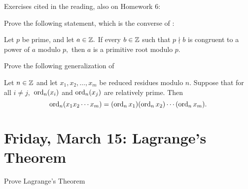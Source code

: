 \documentclass[letterpaper, 11 pt]{ximera}
\begin{document}
Exercises cited in the reading, also on Homework 6:



\begin{br}
    Prove the following statement, which is the converse of :

    Let $p$ be prime, and let $a\in\mathbb Z.$ If every $b\in\mathbb Z$ such that $p\nmid b$ is congruent to a power of $a$ modulo $p,$ then ${a}$ is a primitive root modulo $p$.
    
\end{br}

\begin{br}
    Prove the following generalization of 
    
    
    \begin{lem*}
        Let $n\in\mathbb Z$ and let $x_1,x_2,\dots,x_m$ be reduced residues modulo $n$.  Suppose that for all $i\neq j,$ $\operatorname{ord}_n(x_i)$ and $\operatorname{ord}_n(x_j)$ are relatively prime. Then \[\operatorname{ord}_n(x_1 x_2\cdots x_m)=(\operatorname{ord}_n x_1)(\operatorname{ord}_n x_2)\cdots (\operatorname{ord}_n x_m).\]
    \end{lem*}
\end{br}

\section{Friday, March 15: Lagrange's Theorem}
\begin{obj}
    \item Prove Lagrange's Theorem
\end{obj}
\end{document}
